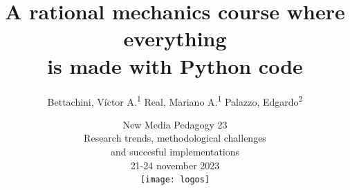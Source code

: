 \documentclass[aspectratio=169]{beamer}
\begin{document}
\title[A code centred mechanics subject]{A rational mechanics course where everything\\is made with Python code}
\author[vbettachini@unlam.edu.ar]{Bettachini, Víctor A.\textsuperscript{1} Real, Mariano A.\textsuperscript{1} Palazzo, Edgardo\textsuperscript{2}}
\date[2023-11-23]{
	New Media Pedagogy 23\\Research trends, methodological challenges\\and succesful implementations\\
	21-24 november 2023\\ \vspace{0.2cm} \texttt{[image: logos]}
}



\begin{frame}
  \titlepage
\end{frame}


\end{document}
